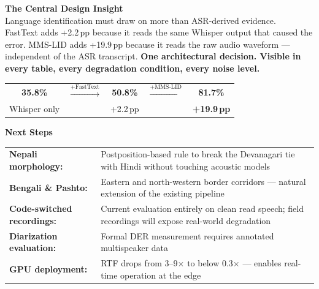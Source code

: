 \documentclass[11pt,a4paper]{article}
\begin{document}
\vspace{6pt}

\begin{tcolorbox}[enhanced,colback=SkyBg,colframe=Royal,arc=6pt,boxrule=2pt,
  left=9pt,right=9pt,top=8pt,bottom=8pt,shadow={2pt}{-2pt}{0pt}{black!12}]
\textbf{\color{Royal}\large The Central Design Insight}\\[5pt]
Language identification must draw on more than ASR-derived evidence.\\[4pt]
FastText adds +2.2\,pp because it reads the same Whisper output that caused the error. MMS-LID adds +19.9\,pp because it reads the raw audio waveform --- independent of the ASR transcript. \textbf{One architectural decision. Visible in every table, every degradation condition, every noise level.}\\[4pt]
\begin{center}
\begin{tabular}{ccccc}
\large\bfseries\color{DRed}35.8\% & \large$\xrightarrow{\text{+FastText}}$ & \large\bfseries\color{Amber}50.8\% & \large$\xrightarrow{\text{+MMS-LID}}$ & \large\bfseries\color{DGreen}81.7\%\\
{\footnotesize Whisper only} & & {\footnotesize +2.2\,pp} & & {\footnotesize \textbf{+19.9\,pp}}\\
\end{tabular}
\end{center}
\end{tcolorbox}

\vspace{6pt}

\begin{tcolorbox}[enhanced,colback=LPurple,colframe=Purple,arc=5pt,boxrule=1.5pt,
  left=9pt,right=9pt,top=7pt,bottom=7pt]
\textbf{\color{Purple}Next Steps}\\[4pt]
\begin{tabular}{@{}p{4cm}p{11.5cm}@{}}
\textbf{Nepali morphology:} & Postposition-based rule to break the Devanagari tie with Hindi without touching acoustic models\\[2pt]
\textbf{Bengali \& Pashto:} & Eastern and north-western border corridors --- natural extension of the existing pipeline\\[2pt]
\textbf{Code-switched recordings:} & Current evaluation entirely on clean read speech; field recordings will expose real-world degradation\\[2pt]
\textbf{Diarization evaluation:} & Formal DER measurement requires annotated multispeaker data\\[2pt]
\textbf{GPU deployment:} & RTF drops from 3--9$\times$ to below 0.3$\times$ --- enables real-time operation at the edge\\
\end{tabular}
\end{tcolorbox}
\end{document}
